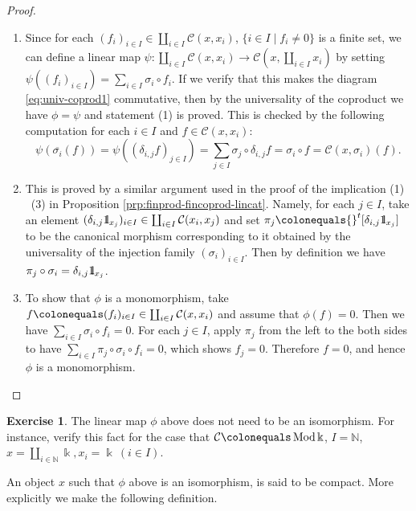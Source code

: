 \documentclass{surv-l}
\numberwithin{equation}{chapter}
\numberwithin{figure}{chapter}
\theoremstyle{plain}
\theoremstyle{definition}
\newtheorem{exc}[thm]{Exercise}
\theoremstyle{remark}
\newcommand{\id}{1\kern-.25em{\text{{\rm l}}}}
\DeclareMathOperator{\Mod}{Mod}
\begin{document}
\begin{proof}\leavevmode
\begin{enumerate}[wide]
\item Since for each $(f_i)_{i\in I} \in \coprod_{i\in I}{\mathcal{C}}(x, x_i)$,
$\{i \in I \mid f_i \ne 0\}$ is a finite set, we can define a linear map
$\psi \colon \coprod_{i\in I}{\mathcal{C}}(x, x_i) \to {\mathcal{C}}(x, \coprod_{i\in I}x_i)$
by setting
$\psi((f_i)_{i\in I}) = \sum_{i\in I}\sigma_i \circ f_i$.
If we verify that this makes the diagram
\eqref{eq:univ-coprod1} commutative, then by the universality of the coproduct
we have $\phi = \psi$ and statement (1) is proved.
This is checked by the following computation
for each $i \in I$ and $f \in {\mathcal{C}}(x, x_i)$:
\[
\psi(\overline{\sigma_i}(f)) = \psi((\delta_{i,j}f)_{j\in I}) = \sum_{j\in I}\sigma_j \circ \delta_{i,j}f = \sigma_i\circ f
={\mathcal{C}}(x, \sigma_i)(f).
\]
\item This is proved by a similar argument used in the proof of the implication
(1) \text{$\Rightarrow$}\  (3) in Proposition \ref{prp:finprod-fincoprod-lincat}.
Namely, for each $j \in I$,
take an element $(\delta_{i,j}\id_{x_j})_{i\in I} \in \coprod_{i\in I}{\mathcal{C}}(x_i, x_j)$
and set $\pi_j\colonequals  {}^t[\delta_{i,j}\id_{x_j}]$ to be the canonical morphism
corresponding to it obtained by the universality of the injection family
$(\sigma_i)_{i\in I}$.
Then by definition we have $\pi_j \circ \sigma_i = \delta_{i,j}\id_{x_j}$.
\item To show that $\phi$ is a monomorphism,
take $f\colonequals  (f_i)_{i\in I} \in \coprod_{i\in I}{\mathcal{C}}(x, x_i)$ and assume that
$\phi(f) = 0$.
Then we have $\sum_{i\in I}\sigma_i \circ f_i = 0$.
For each $j \in I$, apply $\pi_j$ from the left to the both sides
to have
$\sum_{i\in I}\pi_j\circ\sigma_i \circ f_i = 0$, which shows $f_j = 0$.
Therefore $f=0$, and hence $\phi$ is a monomorphism.
\end{enumerate}
\end{proof}

\begin{exc}
The linear map $\phi$ above does not need to be an isomorphism.
For instance, verify this fact for the case that
${\mathcal{C}}\colonequals  \Mod \Bbbk$, $I = \mathbb{N}$, $x = \coprod_{i\in \mathbb{N}} \Bbbk, x_i = \Bbbk \ (i \in I)$.
\end{exc}

An object $x$ such that $\phi$ above is an isomorphism,
is said to be compact.
More explicitly we make the following definition.
\end{document}
